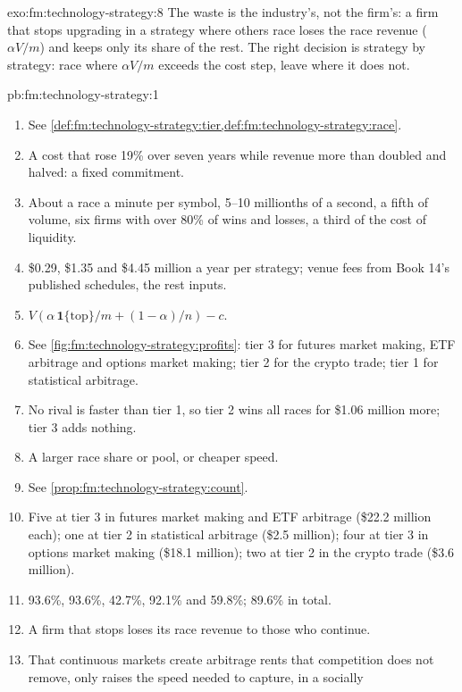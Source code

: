 \begin{solution}{exo:fm:technology-strategy:8}
The waste is the industry's, not the firm's: a firm that stops upgrading in a strategy where others race loses the race revenue ($\alpha V/m$) and
keeps only its share of the rest. The right decision is strategy by strategy: race where $\alpha V/m$ exceeds the cost step, leave where it does not.
\end{solution}

\begin{solution}{pb:fm:technology-strategy:1}
\begin{enumerate}
\item See \cref{def:fm:technology-strategy:tier,def:fm:technology-strategy:race}.
\item A cost that rose 19\% over seven years while revenue more than doubled and halved: a fixed commitment.
\item About a race a minute per symbol, 5--10 millionths of a second, a fifth of volume, six firms with over 80\% of wins and losses, a third of the
cost of liquidity.
\item \$0.29, \$1.35 and \$4.45 million a year per strategy; venue fees from Book 14's published schedules, the rest inputs.
\item $V(\alpha\,\mathbf 1\{\text{top}\}/m+(1-\alpha)/n)-c$.
\item See \cref{fig:fm:technology-strategy:profits}: tier 3 for futures market making, ETF arbitrage and options market making; tier 2 for the crypto
trade; tier 1 for statistical arbitrage.
\item No rival is faster than tier 1, so tier 2 wins all races for \$1.06 million more; tier 3 adds nothing.
\item A larger race share or pool, or cheaper speed.
\item See \cref{prop:fm:technology-strategy:count}.
\item Five at tier 3 in futures market making and ETF arbitrage (\$22.2 million each); one at tier 2 in statistical arbitrage (\$2.5 million); four at
tier 3 in options market making (\$18.1 million); two at tier 2 in the crypto trade (\$3.6 million).
\item 93.6\%, 93.6\%, 42.7\%, 92.1\% and 59.8\%; 89.6\% in total.
\item A firm that stops loses its race revenue to those who continue.
\item That continuous markets create arbitrage rents that competition does not remove, only raises the speed needed to capture, in a socially

\end{enumerate}
\end{solution}
